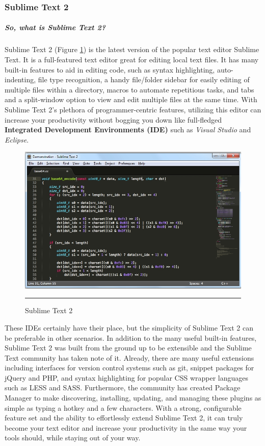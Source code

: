 \subsubsection{Sublime Text 2}
\subparagraph*{So, what is Sublime Text 2?}
\hfill \break
Sublime Text 2 (Figure \ref{fig:sublime}) is the latest version of the popular text editor Sublime Text. It is a full-featured text
editor great for editing local text files. It has many built-in features to aid in editing code, such as
syntax highlighting, auto-indenting, file type recognition, a handy file/folder sidebar for easily
editing of multiple files within a directory, macros to automate repetitious tasks, and tabs and a
split-window option to view and edit multiple files at the same time. With Sublime Text 2's plethora
of programmer-centric features, utilizing this editor can increase your productivity without
bogging you down like full-fledged \textbf{Integrated Development Environments (IDE)} such as \textit{Visual
Studio} and \textit{Eclipse}. \cite{3}
\begin{figure}[h!]
  \centering
    \includegraphics[width=1\textwidth]{./Pictures/sublime.jpg}
  \rule{1\textwidth}{1pt}
  \caption{Sublime Text 2}
    \label{fig:sublime}
\end{figure}

These IDEs certainly have their place, but the simplicity of Sublime Text 2
can be preferable in other scenarios. In addition to the many useful built-in features, Sublime Text
2 was built from the ground up to be extensible and the Sublime Text community has taken note
of it. Already, there are many useful extensions including interfaces for version control systems
such as git, snippet packages for jQuery and PHP, and syntax highlighting for popular CSS wrapper
languages such as LESS and SASS. Furthermore, the community has created Package Manager to
make discovering, installing, updating, and managing these plugins as simple as typing a hotkey
and a few characters. With a strong, configurable feature set and the ability to effortlessly extend
Sublime Text 2, it can truly become your text editor and increase your productivity in the same way
your tools should, while staying out of your way.\cite{3}





